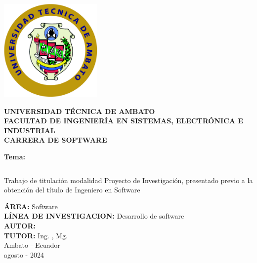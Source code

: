 \begin{titlepage}
	\begin{center}

		\includegraphics[width=50mm]{resources/images/logo-uta.png}

		\textbf{\uppercase{
				Universidad Técnica de Ambato \\
				\vspace{5mm}
				Facultad de Ingeniería en sistemas, electrónica e industrial \\
				\vspace{5mm}
				carrera de software \\
			}}

		\vspace{5mm}
		\textbf{Tema:}
		\vspace{5mm}

		\begin{tabular}[c]{>{\centering\arraybackslash}p{}}
			\toprule
			{\bfseries\MakeUppercase\tema} \\
			\bottomrule
		\end{tabular}

		\vspace{24pt}
		Trabajo de titulación modalidad Proyecto de Investigación, presentado
		previo a la obtención del título de Ingeniero en Software

		\vspace{5mm}
		\textbf{\uppercase{área:}} Software\\
		\vspace{5mm}
		\textbf{\uppercase{línea de investigacion:}} Desarrollo de software\\
		\vspace{5mm}
		\textbf{\uppercase{autor:}} \autor \\
		\vspace{5mm}
		\textbf{\uppercase{tutor:}} Ing. \tutor, Mg.\\

		\vfill
		Ambato - Ecuador\\
		agosto - 2024

	\end{center}
\end{titlepage}
